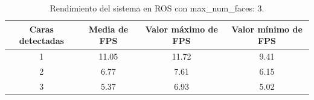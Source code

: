 \begin{table}[H]
\begin{center}
\begin{adjustbox}{max width=\textwidth}
\begin{tabular}{|c|c|c|c|}
     \hline
    \textbf{Caras detectadas} & \textbf{Media de FPS} & \textbf{Valor máximo de FPS} & \textbf{Valor mínimo de FPS}\\
    \hline
     1 & 11.05 & 11.72 & 9.41\\
     2 & 6.77 & 7.61 & 6.15\\
     3 & 5.37 & 6.93 & 5.02\\
     \hline
 \end{tabular}
 \end{adjustbox}
 \captionsetup{justification=centering}
\caption{Rendimiento del sistema en ROS con max\_num\_faces: 3.}
\label{cuadro:rendimiento_ros_3}
\end{center}
\end{table}